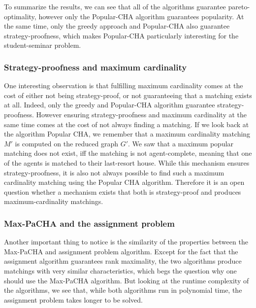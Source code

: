 To summarize the results, we can see that all of the algorithms guarantee pareto-optimality, however only the Popular-CHA algorithm guarantees popularity. At the same time, only the greedy approach and Popular-CHA also guarantee strategy-proofness, which makes Popular-CHA particularly interesting for the student-seminar problem. 

\subsubsection{Strategy-proofness and maximum cardinality}
One interesting observation is that fulfilling maximum cardinality comes at the cost of either not being strategy-proof, or not guaranteeing that a matching exists at all. Indeed, only the greedy and Popular-CHA algorithm guarantee strategy-proofness. However ensuring strategy-proofness and maximum cardinality at the same time comes at the cost of not always finding a matching. If we look back at the algorithm Popular CHA, we remember that a maximum cardinality matching $M'$ is computed on the reduced graph $G'$. We saw that a maximum popular matching does not exist, iff the matching is not agent-complete, meaning that one of the agents is matched to their last-resort house. While this mechanism ensures strategy-proofness, it is also not always possible to find such a maximum cardinality matching using the Popular CHA algorithm. Therefore it is an open question whether a mechanism exists that both is strategy-proof and produces maximum-cardinality matchings.

\subsubsection{Max-PaCHA and the assignment problem}
Another important thing to notice is the similarity of the properties between the Max-PaCHA and assignment problem algorithm. Except for the fact that the assignment algorithm guarantees rank maximality, the two algorithms produce matchings with very similar characteristics, which begs the question why one should use the Max-PaCHA algorithm. But looking at the runtime complexity of the algorithms, we see that, while both algorithms run in polynomial time, the assignment problem takes longer to be solved.